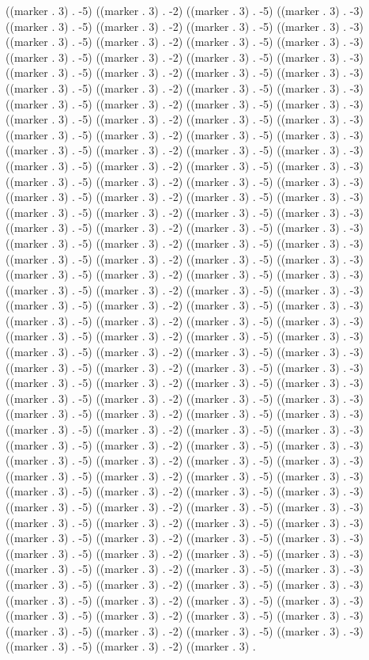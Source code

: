 ((marker . 3) . -5) ((marker . 3) . -2) ((marker . 3) . -5) ((marker . 3) . -3) ((marker . 3) . -5) ((marker . 3) . -2) ((marker . 3) . -5) ((marker . 3) . -3) ((marker . 3) . -5) ((marker . 3) . -2) ((marker . 3) . -5) ((marker . 3) . -3) ((marker . 3) . -5) ((marker . 3) . -2) ((marker . 3) . -5) ((marker . 3) . -3) ((marker . 3) . -5) ((marker . 3) . -2) ((marker . 3) . -5) ((marker . 3) . -3) ((marker . 3) . -5) ((marker . 3) . -2) ((marker . 3) . -5) ((marker . 3) . -3) ((marker . 3) . -5) ((marker . 3) . -2) ((marker . 3) . -5) ((marker . 3) . -3) ((marker . 3) . -5) ((marker . 3) . -2) ((marker . 3) . -5) ((marker . 3) . -3) ((marker . 3) . -5) ((marker . 3) . -2) ((marker . 3) . -5) ((marker . 3) . -3) ((marker . 3) . -5) ((marker . 3) . -2) ((marker . 3) . -5) ((marker . 3) . -3) ((marker . 3) . -5) ((marker . 3) . -2) ((marker . 3) . -5) ((marker . 3) . -3) ((marker . 3) . -5) ((marker . 3) . -2) ((marker . 3) . -5) ((marker . 3) . -3) ((marker . 3) . -5) ((marker . 3) . -2) ((marker . 3) . -5) ((marker . 3) . -3) ((marker . 3) . -5) ((marker . 3) . -2) ((marker . 3) . -5) ((marker . 3) . -3) ((marker . 3) . -5) ((marker . 3) . -2) ((marker . 3) . -5) ((marker . 3) . -3) ((marker . 3) . -5) ((marker . 3) . -2) ((marker . 3) . -5) ((marker . 3) . -3) ((marker . 3) . -5) ((marker . 3) . -2) ((marker . 3) . -5) ((marker . 3) . -3) ((marker . 3) . -5) ((marker . 3) . -2) ((marker . 3) . -5) ((marker . 3) . -3) ((marker . 3) . -5) ((marker . 3) . -2) ((marker . 3) . -5) ((marker . 3) . -3) ((marker . 3) . -5) ((marker . 3) . -2) ((marker . 3) . -5) ((marker . 3) . -3) ((marker . 3) . -5) ((marker . 3) . -2) ((marker . 3) . -5) ((marker . 3) . -3) ((marker . 3) . -5) ((marker . 3) . -2) ((marker . 3) . -5) ((marker . 3) . -3) ((marker . 3) . -5) ((marker . 3) . -2) ((marker . 3) . -5) ((marker . 3) . -3) ((marker . 3) . -5) ((marker . 3) . -2) ((marker . 3) . -5) ((marker . 3) . -3) ((marker . 3) . -5) ((marker . 3) . -2) ((marker . 3) . -5) ((marker . 3) . -3) ((marker . 3) . -5) ((marker . 3) . -2) ((marker . 3) . -5) ((marker . 3) . -3) ((marker . 3) . -5) ((marker . 3) . -2) ((marker . 3) . -5) ((marker . 3) . -3) ((marker . 3) . -5) ((marker . 3) . -2) ((marker . 3) . -5) ((marker . 3) . -3) ((marker . 3) . -5) ((marker . 3) . -2) ((marker . 3) . -5) ((marker . 3) . -3) ((marker . 3) . -5) ((marker . 3) . -2) ((marker . 3) . -5) ((marker . 3) . -3) ((marker . 3) . -5) ((marker . 3) . -2) ((marker . 3) . -5) ((marker . 3) . -3) ((marker . 3) . -5) ((marker . 3) . -2) ((marker . 3) . -5) ((marker . 3) . -3) ((marker . 3) . -5) ((marker . 3) . -2) ((marker . 3) . -5) ((marker . 3) . -3) ((marker . 3) . -5) ((marker . 3) . -2) ((marker . 3) . -5) ((marker . 3) . -3) ((marker . 3) . -5) ((marker . 3) . -2) ((marker . 3) . -5) ((marker . 3) . -3) ((marker . 3) . -5) ((marker . 3) . -2) ((marker . 3) . -5) ((marker . 3) . -3) ((marker . 3) . -5) ((marker . 3) . -2) ((marker . 3) . -5) ((marker . 3) . -3) ((marker . 3) . -5) ((marker . 3) . -2) ((marker . 3) . -5) ((marker . 3) . -3) ((marker . 3) . -5) ((marker . 3) . -2) ((marker . 3) . -5) ((marker . 3) . -3) ((marker . 3) . -5) ((marker . 3) . -2) ((marker . 3) . -5) ((marker . 3) . -3) ((marker . 3) . -5) ((marker . 3) . -2) ((marker . 3) . -5) ((marker . 3) . -3) ((marker . 3) . -5) ((marker . 3) . -2) ((marker . 3) . 